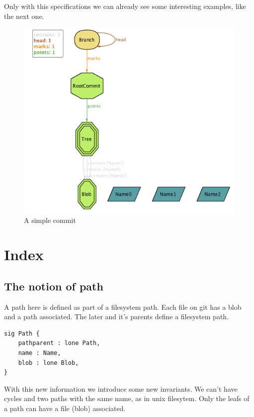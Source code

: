 Only with this specifications we can already see some interesting examples, 
like the next one.\par

\begin{figure}[h!]
	\caption{A simple commit}
  \centering
    \includegraphics[scale=0.65]{images/image1.png}
\end{figure}

\pagebreak
\section{Index}

\subsection{The notion of path}

A path here is defined as part of a filesystem path. 
Each file on git has a blob and a path associated. 
The later and it's parents define a filesystem path.

\begin{lstlisting}
sig Path {
	pathparent : lone Path,
	name : Name,
	blob : lone Blob,
}
\end{lstlisting}

With this new information we introduce some new invariants.
We can't have cycles and two paths with the same
name, as in unix filesytem.
Only the leafs of a path can have a file (blob) associated.

